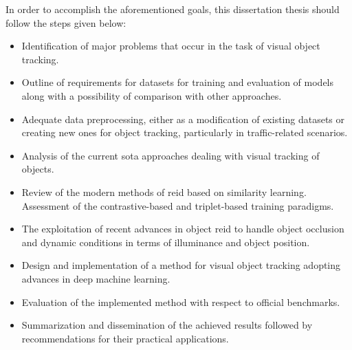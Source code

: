 In order to accomplish the aforementioned goals, this dissertation thesis should follow the steps given below:
\begin{itemize}
    \item Identification of major problems that occur in the task of visual object tracking.
    \item Outline of requirements for datasets for training and evaluation of models along with a possibility of comparison with other approaches.
    \item Adequate data preprocessing, either as a modification of existing datasets or creating new ones for object tracking, particularly in traffic-related scenarios.
    \item Analysis of the current \gls{sota} approaches dealing with visual tracking of objects.
    \item Review of the modern methods of \gls{reid} based on similarity learning. Assessment of the contrastive-based and triplet-based training paradigms.
    \item The exploitation of recent advances in object \gls{reid} to handle object occlusion and dynamic conditions in terms of illuminance and object position.
    \item Design and implementation of a method for visual object tracking adopting advances in deep machine learning.
    \item Evaluation of the implemented method with respect to official benchmarks.
    \item Summarization and dissemination of the achieved results followed by recommendations for their practical applications.
\end{itemize}
